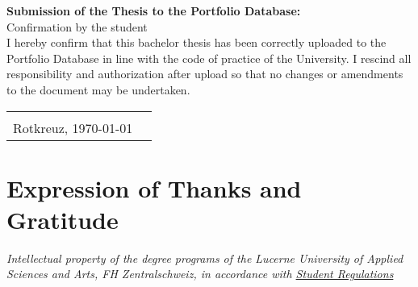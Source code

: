 \begin{titlepage}
\vspace{3em}
\noindent
\textbf{Submission of the Thesis to the Portfolio Database:}\\
Confirmation by the student\\
I hereby confirm that this bachelor thesis has been correctly uploaded to the Portfolio Database in line with the code of practice of the University. I rescind all responsibility and authorization after upload so that no changes or amendments to the document may be undertaken. \\
\begin{tabularx}{\textwidth}{@{}lX}
	&\\
	Rotkreuz, \today &  \\
	\cline{2-2}
\end{tabularx}

\chapter*{Expression of Thanks and Gratitude}

\vspace*{\fill}
\noindent
\emph{Intellectual property of the degree programs of the Lucerne
University of Applied Sciences and Arts, FH Zentralschweiz, in
accordance with 
\href{https://srl.lu.ch/app/de/texts_of_law/521/versions/4065}{Student Regulations}}

\end{titlepage}

